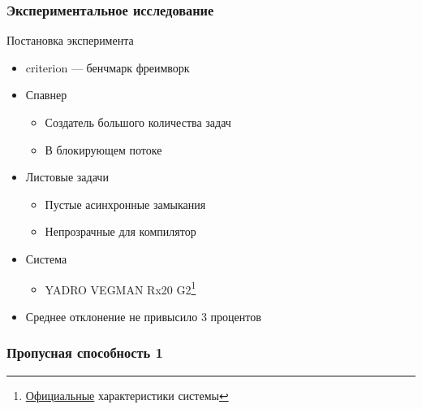 \documentclass{beamer}
\begin{document}
\begin{frame}[fragile]
  \frametitle{Экспериментальное исследование}
  Постановка эксперимента
  \begin{itemize}
    \item criterion --- бенчмарк фреимворк
    \item Спавнер
    \begin{itemize}
      \item Создатель большого количества задач
      \item В блокирующем потоке
    \end{itemize}
    \item Листовые задачи
    \begin{itemize}
      \item Пустые асинхронные замыкания
      \item Непрозрачные для компилятор
    \end{itemize}
    \item Система
    \begin{itemize}
      \item YADRO VEGMAN Rx20 G2\footnote{\href{https://yadro.com/ru/vegman/rx20g2/specs}{Официальные} характеристики системы}
    \end{itemize}
    \item Среднее отклонение не привысило 3 процентов
  \end{itemize}
\end{frame}

\begin{frame}[fragile]
  \frametitle{Пропусная способность 1}

  \begin{center}
  \end{center}
\end{frame}
\end{document}
